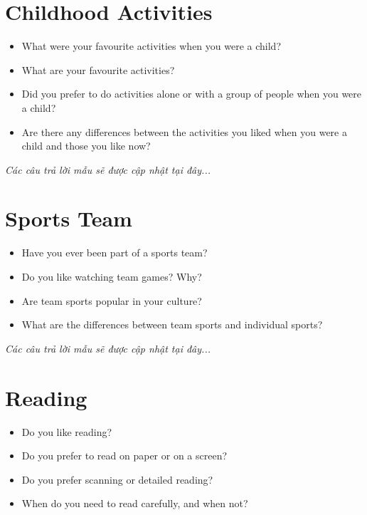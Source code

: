 \section{Childhood Activities}
\begin{ieltsprompt}
\begin{itemize}[itemsep=4pt]
    \item What were your favourite activities when you were a child?
    \item What are your favourite activities?
    \item Did you prefer to do activities alone or with a group of people when you were a child?
    \item Are there any differences between the activities you liked when you were a child and those you like now?
\end{itemize}
\end{ieltsprompt}

\vspace{1em}
\textit{Các câu trả lời mẫu sẽ được cập nhật tại đây...}
\vspace{2em}

\section{Sports Team}
\begin{ieltsprompt}
\begin{itemize}[itemsep=4pt]
    \item Have you ever been part of a sports team?
    \item Do you like watching team games? Why?
    \item Are team sports popular in your culture?
    \item What are the differences between team sports and individual sports?
\end{itemize}
\end{ieltsprompt}

\vspace{1em}
\textit{Các câu trả lời mẫu sẽ được cập nhật tại đây...}
\vspace{2em}

\section{Reading}
\begin{ieltsprompt}
\begin{itemize}[itemsep=4pt]
    \item Do you like reading?
    \item Do you prefer to read on paper or on a screen?
    \item Do you prefer scanning or detailed reading?
    \item When do you need to read carefully, and when not?
\end{itemize}
\end{ieltsprompt}


